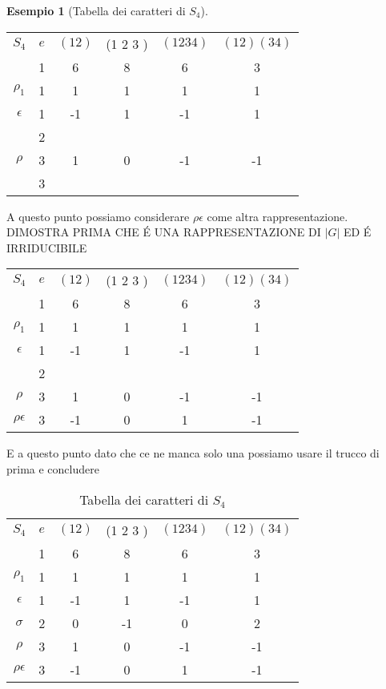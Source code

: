\documentclass[11pt]{article}
\theoremstyle{plain}
\theoremstyle{definition}
\newtheorem{exmp}{Esempio}[section]
\theoremstyle{remark}
\begin{document}
\begin{exmp}[Tabella dei caratteri di $S_4$]
\begin{table}[!ht]
\centering
\begin{tabular}{|c|c|c|c|c|c|}
\hline
$S_4$  & $e$ & $(1 2)$ & (1 2 3 ) & $(1 2 3 4)$ & $(1 2)(3 4)$ \\
 & 1 & 6 & 8 & 6 & 3 \\
\hline
 $\rho_1$ & 1 & 1  & 1 & 1 & 1\\
\hline
$\epsilon$ & 1  & -1 & 1 & -1 & 1 \\
\hline
& 2&  & & & \\
\hline
$\rho$& 3 & 1 & 0 & -1 & -1\\
\hline
& 3&  & & & \\
\hline
\end{tabular}
\end{table}


A questo punto possiamo considerare $\rho\epsilon$ come altra rappresentazione. DIMOSTRA PRIMA CHE \'E UNA RAPPRESENTAZIONE DI $|G|$ ED \'E IRRIDUCIBILE


\begin{table}[!ht]
\centering
\begin{tabular}{|c|c|c|c|c|c|}
\hline
$S_4$  & $e$ & $(1 2)$ & (1 2 3 ) & $(1 2 3 4)$ & $(1 2)(3 4)$ \\
 & 1 & 6 & 8 & 6 & 3 \\
\hline
 $\rho_1$ & 1 & 1  & 1 & 1 & 1\\
\hline
$\epsilon$ & 1  & -1 & 1 & -1 & 1 \\
\hline
& 2&  & & & \\
\hline
$\rho$& 3 & 1 & 0 & -1 & -1\\
\hline
$\rho\epsilon$& 3 & -1 & 0 & 1 & -1\\
\hline
\end{tabular}
\end{table}


E a questo punto dato che ce ne manca solo una possiamo usare il trucco di prima e concludere

\begin{table}[!ht]
\centering
\begin{tabular}{|c|c|c|c|c|c|}
\hline
$S_4$  & $e$ & $(1 2)$ & (1 2 3 ) & $(1 2 3 4)$ & $(1 2)(3 4)$ \\
 & 1 & 6 & 8 & 6 & 3 \\
\hline
 $\rho_1$ & 1 & 1  & 1 & 1 & 1\\
\hline
$\epsilon$ & 1  & -1 & 1 & -1 & 1 \\
\hline
 $\sigma$& 2&  0 & -1& 0 & 2\\
\hline
$\rho$& 3 & 1 & 0 & -1 & -1\\
\hline
$\rho\epsilon$& 3 & -1 & 0 & 1 & -1\\
\hline
\end{tabular}
\caption{Tabella dei caratteri di $S_4$}
\label{tabella caratteri s4}
\end{table}



\end{exmp}
\end{document}
